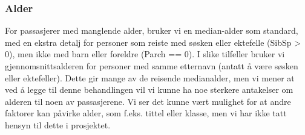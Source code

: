 \documentclass[
]{article}
\newenvironment{Shaded}{\begin{snugshade}}{\end{snugshade}}
\newcommand{\AttributeTok}[1]{\textcolor[rgb]{0.13,0.29,0.53}{#1}}
\newcommand{\ConstantTok}[1]{\textcolor[rgb]{0.56,0.35,0.01}{#1}}
\newcommand{\ControlFlowTok}[1]{\textcolor[rgb]{0.13,0.29,0.53}{\textbf{#1}}}
\newcommand{\DecValTok}[1]{\textcolor[rgb]{0.00,0.00,0.81}{#1}}
\newcommand{\FunctionTok}[1]{\textcolor[rgb]{0.13,0.29,0.53}{\textbf{#1}}}
\newcommand{\NormalTok}[1]{#1}
\newcommand{\OtherTok}[1]{\textcolor[rgb]{0.56,0.35,0.01}{#1}}
\newcommand{\SpecialCharTok}[1]{\textcolor[rgb]{0.81,0.36,0.00}{\textbf{#1}}}
\newcommand{\StringTok}[1]{\textcolor[rgb]{0.31,0.60,0.02}{#1}}
\begin{document}
\subsubsection{Alder}\label{alder}

For passasjerer med manglende alder, bruker vi en median-alder som
standard, med en ekstra detalj for personer som reiste med søsken eller
ektefelle (SibSp \textgreater{} 0), men ikke med barn eller foreldre
(Parch == 0). I slike tilfeller bruker vi gjennomsnittsalderen for
personer med samme etternavn (antatt å være søsken eller ektefeller).
Dette gir mange av de reisende medianalder, men vi mener at ved å legge
til denne behandlingen vil vi kunne ha noe sterkere antakelser om
alderen til noen av passasjerene. Vi ser det kunne vært mulighet for at
andre faktorer kan påvirke alder, som f.eks. tittel eller klasse, men vi
har ikke tatt hensyn til dette i prosjektet.

\begin{Shaded}
\end{Shaded}
\end{document}

